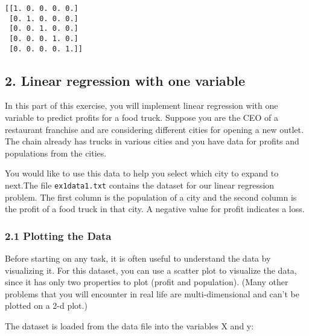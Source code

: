 \documentclass[11pt]{article}
\begin{document}
    \begin{Verbatim}[commandchars=\\\{\}]
[[1. 0. 0. 0. 0.]
 [0. 1. 0. 0. 0.]
 [0. 0. 1. 0. 0.]
 [0. 0. 0. 1. 0.]
 [0. 0. 0. 0. 1.]]

    \end{Verbatim}

    \subsection{2. Linear regression with one
variable}\label{linear-regression-with-one-variable}

In this part of this exercise, you will implement linear regression with
one variable to predict profits for a food truck. Suppose you are the
CEO of a restaurant franchise and are considering different cities for
opening a new outlet. The chain already has trucks in various cities and
you have data for profits and populations from the cities.

You would like to use this data to help you select which city to expand
to next.The file \texttt{ex1data1.txt} contains the dataset for our
linear regression problem. The first column is the population of a city
and the second column is the profit of a food truck in that city. A
negative value for profit indicates a loss.

\subsubsection{2.1 Plotting the Data}\label{plotting-the-data}

Before starting on any task, it is often useful to understand the data
by visualizing it. For this dataset, you can use a scatter plot to
visualize the data, since it has only two properties to plot (profit and
population). (Many other problems that you will encounter in real life
are multi-dimensional and can't be plotted on a 2-d plot.)

The dataset is loaded from the data file into the variables X and y:
\end{document}
